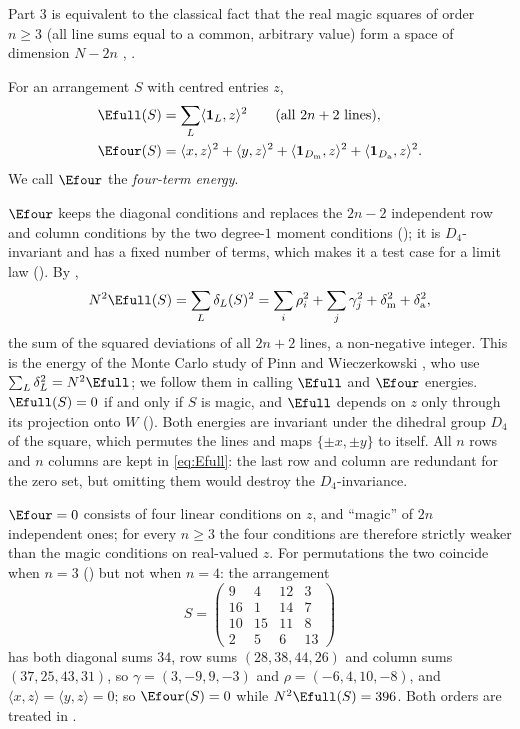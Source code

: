 Part 3 is equivalent to the classical fact that the real magic squares of order $n\ge3$ (all line sums equal to a common, arbitrary value) form a space of dimension $N-2n$ \cite{ward1980vector}, \cite[\S4.6]{stanley2012ec1}.

\begin{definition}[Energies]
\label{def:energies}
For an arrangement $S$ with centred entries $z$,
\begin{align}
\Efull(S)&=\sum_{L}\langle\mathbf 1_L,z\rangle^{2}\qquad\text{(all $2n+2$ lines)},\label{eq:Efull}\\
\Efour(S)&=\langle x,z\rangle^{2}+\langle y,z\rangle^{2}+\langle\mathbf 1_{D_{\mathrm m}},z\rangle^{2}+\langle\mathbf 1_{D_{\mathrm a}},z\rangle^{2}.\label{eq:Elow}
\end{align}
We call $\Efour$ the \emph{four-term energy}.
\end{definition}

$\Efour$ keeps the diagonal conditions and replaces the $2n-2$ independent row and column conditions by the two degree-$1$ moment conditions (); it is $D_4$-invariant and has a fixed number of terms, which makes it a test case for a limit law ().
By ,
\begin{equation}
N^{2}\Efull(S)=\sum_{L}\delta_L(S)^{2}=\sum_i\rho_i^{2}+\sum_j\gamma_j^{2}+\delta_{\mathrm m}^{2}+\delta_{\mathrm a}^{2},
\label{eq:Efull_devs}
\end{equation}
the sum of the squared deviations of all $2n+2$ lines, a non-negative integer.
This is the energy of the Monte Carlo study of Pinn and Wieczerkowski \cite{pinn1998number}, who use $\sum_L\delta_L^2=N^2\Efull$; we follow them in calling $\Efull$ and $\Efour$ energies.
$\Efull(S)=0$ if and only if $S$ is magic, and $\Efull$ depends on $z$ only through its projection onto $W$ ().
Both energies are invariant under the dihedral group $D_4$ of the square, which permutes the lines and maps $\{\pm x,\pm y\}$ to itself.
All $n$ rows and $n$ columns are kept in \eqref{eq:Efull}: the last row and column are redundant for the zero set, but omitting them would destroy the $D_4$-invariance.

\begin{remark}
\label{rem:four_term_insufficient}
$\Efour=0$ consists of four linear conditions on $z$, and ``magic'' of $2n$ independent ones; for every $n\ge3$ the four conditions are therefore strictly weaker than the magic conditions on real-valued $z$.
For permutations the two coincide when $n=3$ () but not when $n=4$: the arrangement
\[
S=\begin{pmatrix}9&4&12&3\\16&1&14&7\\10&15&11&8\\2&5&6&13\end{pmatrix}
\]
has both diagonal sums $34$, row sums $(28,38,44,26)$ and column sums $(37,25,43,31)$, so $\gamma=(3,-9,9,-3)$ and $\rho=(-6,4,10,-8)$, and $\langle x,z\rangle=\langle y,z\rangle=0$; so $\Efour(S)=0$ while $N^2\Efull(S)=396$.
Both orders are treated in .
\end{remark}

